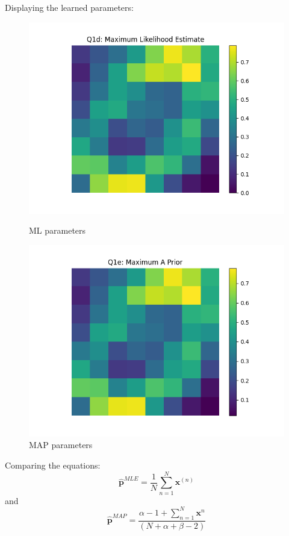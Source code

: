 \documentclass[12pt]{article}
\begin{document}
\begin{enumerate}
Displaying the learned parameters:
\begin{figure}[h]
\centering
\begin{minipage}{0.5\textwidth}
  \centering
  \includegraphics[scale=0.4]{outputs/q1/q1d}
  \caption{ML parameters}
  \label{fig:1d}
\end{minipage}%
\begin{minipage}{0.5\textwidth}
  \centering
  \includegraphics[scale=0.4]{outputs/q1/q1e}
  \caption{MAP parameters}
  \label{fig:1e}
\end{minipage}
\end{figure}

Comparing the equations:
    $$\hat{\textbf{p}}^{MLE} = \frac{1}{N}\sum_{n=1}^{N} \textbf{x}^{(n)}$$
    and
    $$\hat{\textbf{p}}^{MAP}  =  \frac{\alpha - 1 +\sum_{n=1}^{N} \textbf{x}^n}{(N+\alpha+\beta-2)}$$


\end{enumerate}
\end{document}

